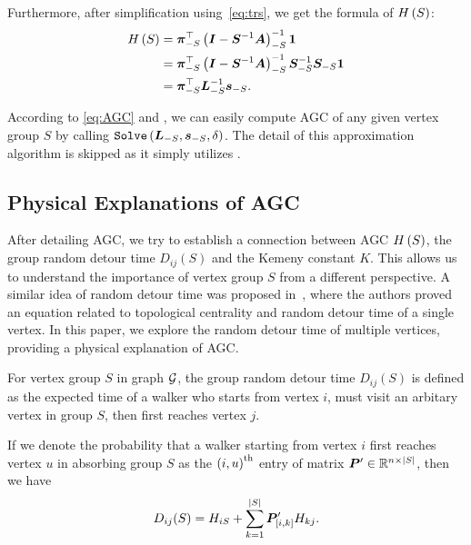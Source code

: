 \documentclass[10pt,journal,compsoc,twocolumn,twoside]{IEEEtran}
\begin{document}
Furthermore, after simplification using~\eqref{eq:trs}, we get the formula of \(H\left(S\right)\):
\begin{equation}\label{eq:AGC}
    \begin{split}
        H\left(S\right) & =\boldsymbol{\pi}_{-S}^\top\left( \boldsymbol{I}-\boldsymbol{S}^{-1}\boldsymbol{A} \right)_{-S}^{-1}\boldsymbol{1}                          \\
        & =\boldsymbol{\pi}_{-S}^\top\left( \boldsymbol{I}-\boldsymbol{S}^{-1}\boldsymbol{A} \right)_{-S}^{-1}\boldsymbol{S}_{-S}^{-1}\boldsymbol{S}_{-S}\boldsymbol{1} \\
        & =\boldsymbol{\pi}_{-S}^\top\boldsymbol{L}_{-S}^{-1}\boldsymbol{s}_{-S}.
    \end{split}
\end{equation}

According to \eqref{eq:AGC} and , we can easily compute AGC of any given vertex group \(S\) by calling \(\mathtt{Solve}\left( \boldsymbol{L}_{-S},\boldsymbol{s}_{-S},\delta \right)\).
The detail of this approximation algorithm is skipped as it simply utilizes .

\subsection{Physical Explanations of AGC}

After detailing AGC, we try to establish a connection between AGC \(H\left(S\right)\), the group random detour time \(D_{ij}(S)\) and the Kemeny constant \(K\).
This allows us to understand the importance of vertex group \(S\) from a different perspective.
A similar idea of random detour time was proposed in~\cite{RaZh13}, where the authors proved an equation related to topological centrality and random detour time of a single vertex.
In this paper, we explore the random detour time of multiple vertices, providing a physical explanation of AGC.

For vertex group \(S\) in graph \(\mathcal{G}\), the group random detour time \(D_{ij}(S)\) is defined as the expected time of a walker who starts from vertex \(i\), must visit an arbitary vertex in group \(S\), then first reaches vertex \(j\).

\begin{definition}\label{def:detour-multiple}
    If we denote the probability that a walker starting from vertex \(i\) first reaches vertex \(u\) in absorbing group \(S\) as the \({(i,u)}^{\rm{th}}\) entry of matrix \(\boldsymbol{P}'\in\mathbb{R}^{n\times\left|S \right|}\), then we have
    \begin{equation*}
        D_{ij}(S)= H_{iS}+\sum_{k=1}^{\left|S \right|}\boldsymbol{P}'_{[i,k]}H_{kj}.
    \end{equation*}
\end{definition}
\end{document}
